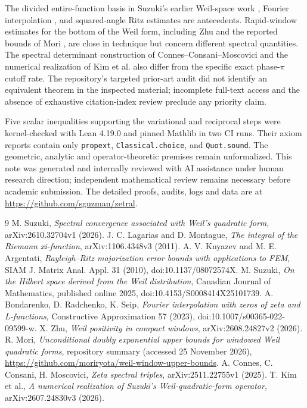 \documentclass[11pt]{article}
\begin{document}
The divided entire-function basis in Suzuki's earlier Weil-space work \cite{suzuki2025}, Fourier interpolation \cite{brs}, and squared-angle Ritz estimates \cite{ritz} are antecedents. Rapid-window estimates for the bottom of the Weil form, including Zhu \cite{zhu} and the reported bounds of Mori \cite{mori}, are close in technique but concern different spectral quantities. The spectral determinant construction of Connes--Consani--Moscovici \cite{ccm} and the numerical realization of Kim et al. \cite{kim} also differ from the specific exact phase-$\pi$ cutoff rate. The repository's targeted prior-art audit did not identify an equivalent theorem in the inspected material; incomplete full-text access and the absence of exhaustive citation-index review preclude any priority claim.

Five scalar inequalities supporting the variational and reciprocal steps were kernel-checked with Lean 4.19.0 and pinned Mathlib in two CI runs. Their axiom reports contain only \texttt{propext}, \texttt{Classical.choice}, and \texttt{Quot.sound}. The geometric, analytic and operator-theoretic premises remain unformalized. This note was generated and internally reviewed with AI assistance under human research direction; independent mathematical review remains necessary before academic submission. The detailed proofs, audits, logs and data are at \url{https://github.com/sguzman/zetral}.
\begin{thebibliography}{9}
\small
\setlength{\itemsep}{0pt}
 M. Suzuki, \emph{Spectral convergence associated with Weil's quadratic form}, arXiv:2610.32704v1 (2026).
 J. C. Lagarias and D. Montague, \emph{The integral of the Riemann xi-function}, arXiv:1106.4348v3 (2011).
 A. V. Knyazev and M. E. Argentati, \emph{Rayleigh--Ritz majorization error bounds with applications to FEM}, SIAM J. Matrix Anal. Appl. 31 (2010), doi:10.1137/08072574X.
 M. Suzuki, \emph{On the Hilbert space derived from the Weil distribution}, Canadian Journal of Mathematics, published online 2025, doi:10.4153/S0008414X25101739.
 A. Bondarenko, D. Radchenko, K. Seip, \emph{Fourier interpolation with zeros of zeta and L-functions}, Constructive Approximation 57 (2023), doi:10.1007/s00365-022-09599-w.
 X. Zhu, \emph{Weil positivity in compact windows}, arXiv:2608.24827v2 (2026).
 R. Mori, \emph{Unconditional doubly exponential upper bounds for windowed Weil quadratic forms}, repository summary (accessed 25 November 2026), \url{https://github.com/moriryota/weil-window-upper-bounds}.
 A. Connes, C. Consani, H. Moscovici, \emph{Zeta spectral triples}, arXiv:2511.22755v1 (2025).
 T. Kim et al., \emph{A numerical realization of Suzuki's Weil-quadratic-form operator}, arXiv:2607.24830v3 (2026).
\end{thebibliography}
\end{document}
